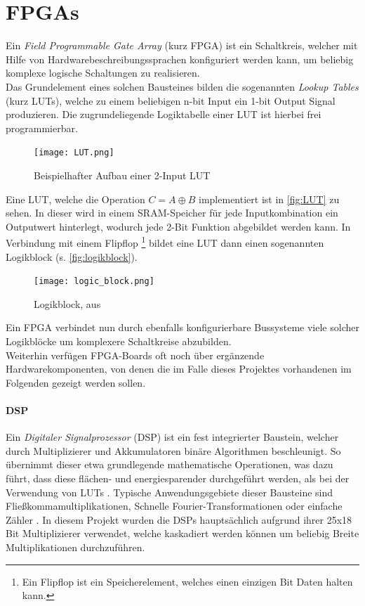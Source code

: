 \documentclass[a4paper,12pt,onesided]{report}
\begin{document}
\section{FPGAs}
Ein \textit{Field Programmable Gate Array} (kurz FPGA) ist ein Schaltkreis, welcher mit Hilfe von Hardwarebeschreibungssprachen %
konfiguriert werden kann, um beliebig komplexe logische Schaltungen zu realisieren.\\
Das Grundelement eines solchen Bausteines bilden die sogenannten \textit{Lookup Tables} (kurz LUTs), welche zu einem beliebigen n-bit Input ein 1-bit Output Signal produzieren. Die zugrundeliegende Logiktabelle einer LUT ist hierbei frei programmierbar.

\begin{figure}[H]
	\centering
	\texttt{[image: LUT.png]}
	\caption{Beispielhafter Aufbau einer 2-Input LUT}
	\label{fig:LUT}
\end{figure}

Eine LUT, welche die Operation $C = A \oplus B$ implementiert ist in \autoref{fig:LUT} zu sehen. In dieser wird in einem SRAM-Speicher für jede Inputkombination ein Outputwert hinterlegt, wodurch jede 2-Bit Funktion abgebildet werden kann. In Verbindung mit einem Flipflop \footnote{Ein Flipflop ist ein Speicherelement, welches einen einzigen Bit Daten halten kann.} bildet eine LUT dann einen sogenannten Logikblock (s. \autoref{fig:logikblock}).\cite{fpgaDesign}

\begin{figure}[H]
	\centering
	\texttt{[image: logic\_block.png]}
	\caption{Logikblock, aus \cite{fpgaDesign}}
	\label{fig:logikblock}
\end{figure}

Ein FPGA verbindet nun durch ebenfalls konfigurierbare Bussysteme viele solcher Logikblöcke um komplexere Schaltkreise abzubilden.\\
Weiterhin verfügen FPGA-Boards oft noch über ergänzende Hardwarekomponenten, von denen die im Falle dieses Projektes vorhandenen im Folgenden gezeigt werden sollen.

\paragraph{DSP}
Ein \textit{Digitaler Signalprozessor} (DSP) ist ein fest integrierter Baustein, welcher durch Multiplizierer und Akkumulatoren binäre Algorithmen beschleunigt.
So übernimmt dieser etwa grundlegende mathematische Operationen, was dazu führt, dass diese flächen- und energiesparender durchgeführt werden, als bei der Verwendung von LUTs \cite[S. 52]{dsps}.
Typische Anwendungsgebiete dieser Bausteine sind Fließkommamultiplikationen, Schnelle Fourier-Transformationen oder einfache Zähler \cite[S. 14]{dsps}. 
In diesem Projekt wurden die DSPs hauptsächlich aufgrund ihrer 25x18 Bit Multiplizierer verwendet, welche kaskadiert werden können um beliebig Breite Multiplikationen durchzuführen.
\end{document}
